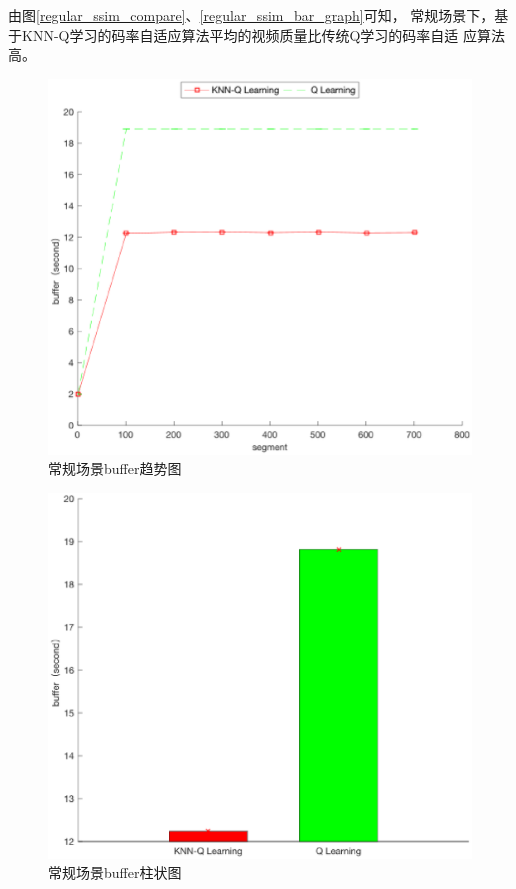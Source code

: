 \documentclass[twocolumn]{article}
\begin{document}
由图\ref{regular_ssim_compare}、\ref{regular_ssim_bar_graph}可知，
常规场景下，基于KNN-Q学习的码率自适应算法平均的视频质量比传统Q学习的码率自适
应算法高。
\begin{figure}[htbp]
\centering
\includegraphics[width=\columnwidth]{regular_buffer_compare}
\caption{常规场景buffer趋势图}
\label{regular_buffer_compare}
\end{figure}
\begin{figure}[htbp]
\centering
\includegraphics[width=\columnwidth]{regular_buffer_bar_graph}
\caption{常规场景buffer柱状图}
\label{regular_buffer_bar_graph}
\end{figure}
\end{document}
